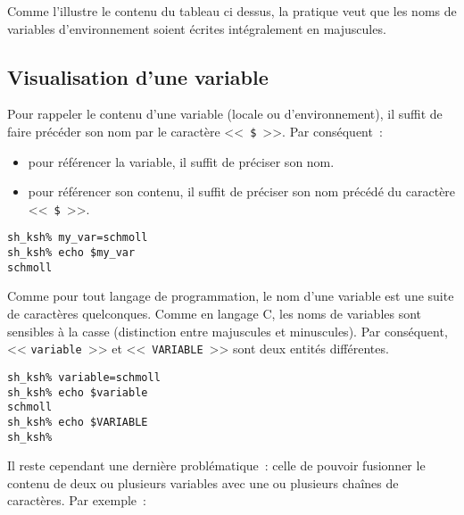\begin{remarque}
Comme l'illustre le contenu du tableau ci dessus, la pratique veut que les noms de variables
d'environnement soient {\'e}crites int{\'e}gralement en majuscules.
\end{remarque}

\subsection{\label{basicnot-visuvariable}Visualisation d'une variable}

Pour rappeler le contenu d'une variable
(locale ou d'environnement), il suffit de faire pr{\'e}c{\'e}der son nom
par le caract{\`e}re <<~\texttt{\$}~>>. Par cons{\'e}quent~:
\begin{itemize}
	\item pour r{\'e}f{\'e}rencer la variable, il suffit de pr{\'e}ciser son nom.
	\item pour r{\'e}f{\'e}rencer son contenu, il suffit de pr{\'e}ciser son nom pr{\'e}c{\'e}d{\'e} du
		  caract{\`e}re <<~\texttt{\$}~>>.
\end{itemize}

\begin{example}
\begin{verbatim}
sh_ksh% my_var=schmoll
sh_ksh% echo $my_var
schmoll
\end{verbatim}
\end{example}

Comme pour tout langage de programmation, le nom d'une variable est une suite de caract\`{e}res
quelconques. Comme en langage C, les noms de variables sont sensibles \`{a} la casse (distinction entre
majuscules et minuscules). Par cons\'{e}quent, << \texttt{variable}~>> et <<~\texttt{VARIABLE}~>>
sont deux entit\'{e}s diff\'{e}rentes.
\begin{example}
\begin{verbatim}
sh_ksh% variable=schmoll
sh_ksh% echo $variable
schmoll
sh_ksh% echo $VARIABLE
sh_ksh% 
\end{verbatim}
\end{example}

Il reste cependant une derni\`{e}re probl\'{e}matique~: celle de pouvoir fusionner le contenu de
deux ou plusieurs variables avec une ou plusieurs cha\^{i}nes de caract\`{e}res. Par exemple~:

